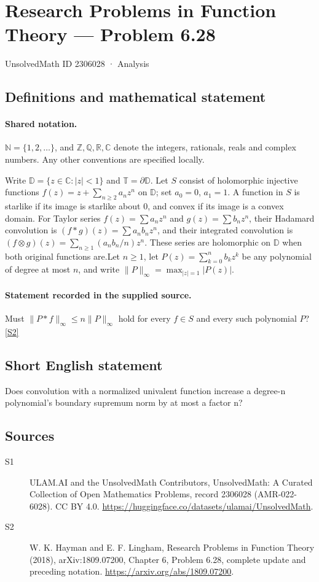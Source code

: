 \documentclass[11pt]{article}
\newcommand{\sref}[2]{\hyperlink{source:#1:#2}{[S#2]}}
\begin{document}
\setcounter{section}{2306027}
\section{Research Problems in Function Theory — Problem 6.28}\label{2306028}
{\small\sffamily UnsolvedMath ID 2306028 · Analysis}
\subsection{Definitions and mathematical statement}

\paragraph{Shared notation.}$\mathbb N=\{1,2,\ldots\}$, and $\mathbb Z,\mathbb Q,\mathbb R,\mathbb C$ denote the integers, rationals, reals and complex numbers. Any other conventions are specified locally.


Write $\mathbb D=\{z\in\mathbb C:|z|<1\}$ and $\mathbb T=\partial\mathbb D$. Let $S$ consist of holomorphic injective functions $f(z)=z+\sum_{n\ge2}a_nz^n$ on $\mathbb D$; set $a_0=0$, $a_1=1$. A function in $S$ is starlike if its image is starlike about $0$, and convex if its image is a convex domain. For Taylor series $f(z)=\sum a_nz^n$ and $g(z)=\sum b_nz^n$, their Hadamard convolution is $(f*g)(z)=\sum a_nb_nz^n$, and their integrated convolution is $(f\otimes g)(z)=\sum_{n\ge1}(a_nb_n/n)z^n$. These series are holomorphic on $\mathbb D$ when both original functions are.Let $n\ge1$, let $P(z)=\sum_{k=0}^n b_kz^k$ be any polynomial of degree at most $n$, and write $\|P\|_\infty=\max_{|z|=1}|P(z)|$.
\paragraph{Statement recorded in the supplied source.}
Must $\|P*f\|_\infty\le n\|P\|_\infty$ hold for every $f\in S$ and every such polynomial $P$? \sref{2306028}{2}
\subsection{Short English statement}
Does convolution with a normalized univalent function increase a degree-n polynomial’s boundary supremum norm by at most a factor n?
\subsection{Sources}
\begin{description}
\item[\hypertarget{source:2306028:1}{S1}] ULAM.AI and the UnsolvedMath Contributors, UnsolvedMath: A Curated Collection of Open Mathematics Problems, record 2306028 (AMR-022-6028). CC BY 4.0. \url{https://huggingface.co/datasets/ulamai/UnsolvedMath}.
\item[\hypertarget{source:2306028:2}{S2}] W. K. Hayman and E. F. Lingham, Research Problems in Function Theory (2018), arXiv:1809.07200, Chapter 6, Problem 6.28, complete update and preceding notation. \url{https://arxiv.org/abs/1809.07200}.
\end{description}
\label{end:2306028}
\end{document}
